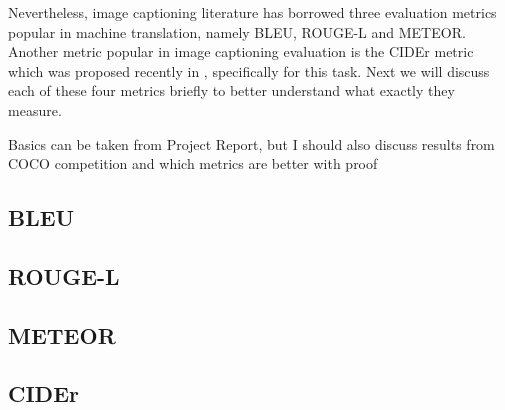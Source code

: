 Nevertheless, image captioning literature has borrowed three evaluation metrics
popular in machine translation, namely BLEU\cite{Papineni:BLEU},
ROUGE-L\cite{lin2004rouge} and METEOR\cite{denkowski-lavie:2014:Meteor}. 
Another metric popular in image captioning evaluation is the CIDEr metric which
was proposed recently in \cite{Vedantam_2015_CVPR}, specifically for this task. 
Next we will discuss each of these four metrics briefly to better understand
what exactly they measure.

Basics can be taken from Project Report, but I should also
discuss results from COCO competition and which metrics are better with proof

\subsection*{BLEU}
\subsection*{ROUGE-L}
\subsection*{METEOR}
\subsection*{CIDEr}
